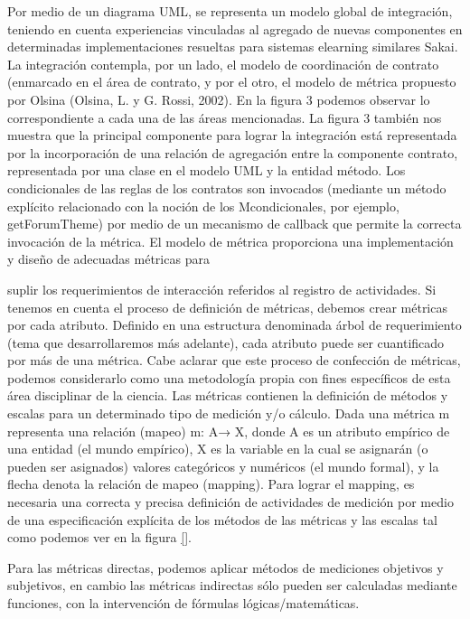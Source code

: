 Por medio de un diagrama UML, se representa un modelo global de integración, teniendo en cuenta experiencias vinculadas al agregado de nuevas componentes en determinadas implementaciones resueltas para sistemas elearning similares Sakai. La integración contempla, por un lado, el modelo de coordinación de contrato (enmarcado en el área de contrato, y por el otro, el modelo de métrica propuesto por Olsina (Olsina, L. y G. Rossi, 2002). En la figura 3 podemos observar lo correspondiente a cada una de las áreas mencionadas. La figura 3 también nos muestra que la principal componente para lograr la integración está representada por la incorporación de una relación de agregación entre la componente contrato, representada por una clase en el modelo UML y la entidad método. Los condicionales de las reglas de los contratos son
invocados (mediante un método explícito relacionado con la noción de los
Mcondicionales, por ejemplo, getForumTheme) por medio de un mecanismo
de callback que permite la correcta invocación de la métrica. El modelo de
métrica proporciona una implementación y diseño de adecuadas métricas para

suplir los requerimientos de interacción referidos al registro de actividades. Si
tenemos en cuenta el proceso de definición de métricas, debemos crear métricas
por cada atributo. Definido en una estructura denominada árbol de requerimiento
(tema que desarrollaremos más adelante), cada atributo puede ser
cuantificado por más de una métrica.
Cabe aclarar que este proceso de confección de métricas, podemos considerarlo
como una metodología propia con fines específicos de esta área disciplinar
de la ciencia.
Las métricas contienen la definición de métodos y escalas para un determinado
tipo de medición y/o cálculo. Dada una métrica m representa una relación
(mapeo) m: A→ X, donde A es un atributo empírico de una entidad (el
mundo empírico), X es la variable en la cual se asignarán (o pueden ser asignados)
valores categóricos y numéricos (el mundo formal), y la flecha denota
la relación de mapeo (mapping). Para lograr el mapping, es necesaria una
correcta y precisa definición de actividades de medición por medio de una
especificación explícita de los métodos de las métricas y las escalas tal como
podemos ver en la figura \ref{}.

Para las métricas directas, podemos aplicar métodos de mediciones objetivos
y subjetivos, en cambio las métricas indirectas sólo pueden ser calculadas
mediante funciones, con la intervención de fórmulas lógicas/matemáticas.


